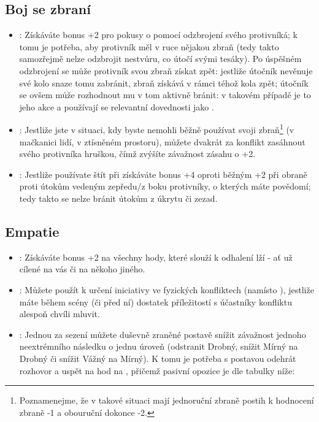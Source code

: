 \subsection{Boj se zbraní}
\label{sec:trik-bsz}
\begin{itemize}
\item{}:
  Získáváte bonus +2 pro pokusy o  pomocí odzbrojení svého protivníká; k tomu je potřeba, aby protivník měl v ruce nějakou zbraň (tedy takto samozřejmě nelze odzbrojit nestvůru, co útočí svými tesáky). Po úspěšném odzbrojení se může protivník svou zbraň získat zpět: jestliže útočník nevěnuje své kolo snaze tomu zabránit, zbraň získává v rámci téhož kola zpět; útočník se ovšem může rozhodnout mu v tom aktivně bránit: v takovém případě je to jeho akce a používají se relevantní dovednosti jako .

\item{}:
\label{sec:bsz-hruska}
Jestliže jste v situaci, kdy byste nemohli běžně používat svoji zbraň\footnote{Poznamenejme, že v takové situaci mají jednoruční zbraně postih k hodnocení zbraně -1 a obouruční dokonce -2.} (v mačkanici lidí, v ztísněném prostoru), můžete dvakrát za konflikt zasáhnout svého protivníka hruškou, čímž zvýšíte závažnost zásahu o +2.

\item{}:
  \label{sec:bsz-stitar}
Jestliže používate štít při  získáváte bonus +4 oproti běžným +2 při obraně proti útokům vedeným zepředu/z boku protivníky, o kterých máte povědomí; tedy takto se nelze bránit útokům z úkrytu či zezad. 
\end{itemize}



\subsection{Empatie}
\label{sec:trik-empatie}

\begin{itemize}
\item{}:
\label{sec:empatie-odhalovani} Získáváte bonus +2 na všechny hody, které slouží k odhalení lží - ať už cílené na vás či na někoho jiného.

\item{}:
\label{sec:empatie-cit} Můžete použít  k určení iniciativy ve fyzických konfliktech (namísto ), jestliže máte během scény (či před ní) dostatek příležitostí s účastníky konfliktu alespoň chvíli mluvit.

\item{}:
\label{sec:empatie-terapuet} Jednou za sezení můžete duševně zraněné postavě snížit závažnost jednoho neextrémního následku o jednu úroveň (odstranit Drobný, snížit Mírný na Drobný či snížit Vážný na Mírný). K tomu je potřeba s postavou odehrát rozhovor a uspět na hod na , přičemž pasivní opozice je dle tabulky níže:
\end{itemize}

